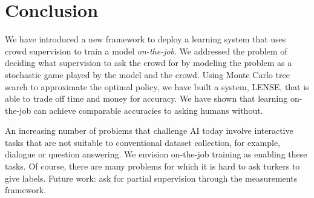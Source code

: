 \section{Conclusion}
\label{sec:conclusion}

We have introduced a new framework to deploy a learning system that uses crowd supervision to train a model {\em on-the-job}.
We addressed the problem of deciding what supervision to ask the crowd for by modeling the problem as a stochastic game played by the model and the crowd. 
Using Monte Carlo tree search to approximate the optimal policy, we have built a system, LENSE, that is able to trade off time and money for accuracy.
We have shown that learning on-the-job can achieve comparable accuracies to asking humans without. 

An increasing number of problems that challenge AI today involve interactive tasks that are not suitable to conventional dataset collection, for example, dialogue or question answering.
We envision on-the-job training as enabling these tasks.
Of course, there are many problems for which it is hard to ask turkers to give labels. Future work: ask for partial supervision through the measurements framework.

